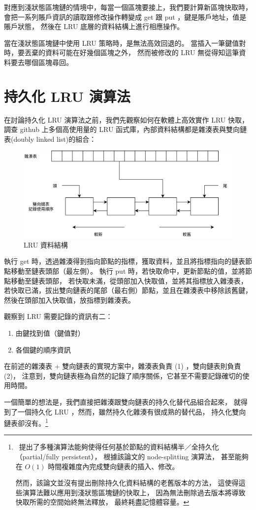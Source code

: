 對應到淺狀態區塊鏈的情境中，每當一個區塊要接上，我們要計算新區塊快取時，
會把一系列賬戶資訊的讀取跟修改操作轉變成 get 跟 put ，鍵是賬戶地址，值是賬戶狀態，
然後在 LRU 底層的資料結構上進行相應操作。

當在淺狀態區塊鏈中使用 LRU 策略時，是無法高效回退的。
當插入一筆鍵值對時，要丟棄的資料可能在好幾個區塊之外，
然而被修改的 LRU 無從得知這筆資料要去哪個區塊尋回。

\section{持久化 LRU 演算法}
在討論持久化 LRU 演算法之前，我們先觀察如何在軟體上高效實作 LRU 快取，
調查 github 上多個高使用量的 LRU 函式庫，內部資料結構都是雜湊表與雙向鏈表(doubly linked list)的組合：

\begin{figure}[h]
\includegraphics[width=\textwidth]{LRU實作}
\caption{LRU 資料結構}
\end{figure}


執行 get 時，透過雜湊得到指向節點的指標，獲取資料，並且將指標指向的鏈表節點移動至鏈表頭部（最左側）。
執行 put 時，若快取命中，更新節點的值，並將節點移動至鏈表頭部，
若快取未滿，從頭部加入快取值，並將其指標放入雜湊表，
若快取已滿，拔出雙向鏈表的尾部（最右側）節點，並且在雜湊表中移除該舊鍵，
然後在頭部加入快取值，放指標到雜湊表。

觀察到 LRU 需要記錄的資訊有二：

\begin{enumerate}
  \item 由鍵找到值（鍵值對）
  \item 各個鍵的順序資訊
\end{enumerate}

在前述的雜湊表 + 雙向鏈表的實現方案中，雜湊表負責 (1) ，雙向鏈表則負責 (2)，
注意到，雙向鏈表極為自然的記錄了順序關係，它甚至不需要記錄確切的使用時間。

一個簡單的想法是，我們直接把雜湊跟雙向鏈表的持久化替代品組合起來，
就得到了一個持久化 LRU ，然而，雖然持久化雜湊有很成熟的替代品，
持久化雙向鏈表卻沒有。\footnote{
~\cite{driscoll1986making}提出了多種演算法能夠使得任何基於節點的資料結構半／全持久化（partial/fully persistent），
根據該論文的 node-splitting 演算法，
甚至能夠在 $O(1)$ 時間複雜度內完成雙向鏈表的插入、修改。

然而，該論文並沒有提出刪除持久化資料結構的老舊版本的方法，
這使得這些演算法難以應用到淺狀態區塊鏈的快取上，
因為無法刪除過去版本將導致快取所需的空間始終無法釋放，
最終耗盡記憶體容量。
}

